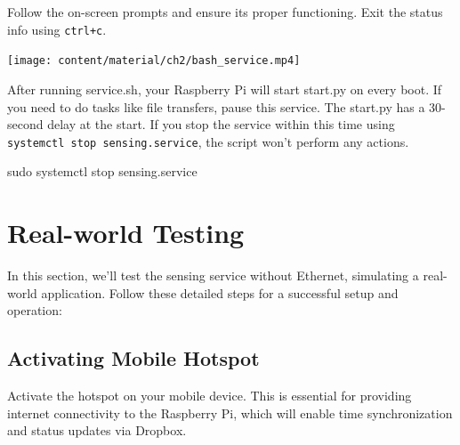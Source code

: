 \documentclass[
  letterpaper,
]{scrbook}
\newenvironment{Shaded}{\begin{snugshade}}{\end{snugshade}}
\newcommand{\FunctionTok}[1]{\textcolor[rgb]{0.28,0.35,0.67}{#1}}
\newcommand{\NormalTok}[1]{\textcolor[rgb]{0.00,0.23,0.31}{#1}}
\begin{document}
Follow the on-screen prompts and ensure its proper functioning. Exit the
status info using \texttt{ctrl+c}.

\texttt{[image: content/material/ch2/bash\_service.mp4]}

\begin{tcolorbox}[enhanced jigsaw, bottomrule=.15mm, opacitybacktitle=0.6, toprule=.15mm, colback=white, colbacktitle=quarto-callout-note-color!10!white, left=2mm, colframe=quarto-callout-note-color-frame, coltitle=black, title=\textcolor{quarto-callout-note-color}{\faInfo}\hspace{0.5em}{Note}, opacityback=0, breakable, bottomtitle=1mm, toptitle=1mm, titlerule=0mm, arc=.35mm, leftrule=.75mm, rightrule=.15mm]

After running service.sh, your Raspberry Pi will start start.py on every
boot. If you need to do tasks like file transfers, pause this service.
The start.py has a 30-second delay at the start. If you stop the service
within this time using \texttt{systemctl\ stop\ sensing.service}, the
script won't perform any actions.

\begin{Shaded}
\begin{Highlighting}[]
\FunctionTok{sudo}\NormalTok{ systemctl stop sensing.service}
\end{Highlighting}
\end{Shaded}

\end{tcolorbox}

\hypertarget{real-world-testing}{%
\section{Real-world Testing}\label{real-world-testing}}

In this section, we'll test the sensing service without Ethernet,
simulating a real-world application. Follow these detailed steps for a
successful setup and operation:

\hypertarget{activating-mobile-hotspot}{%
\subsection{Activating Mobile Hotspot}\label{activating-mobile-hotspot}}

Activate the hotspot on your mobile device. This is essential for
providing internet connectivity to the Raspberry Pi, which will enable
time synchronization and status updates via Dropbox.
\end{document}
